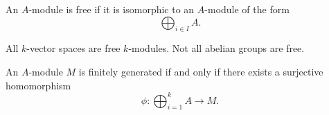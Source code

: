 \begin{df}
  An $A$-module is free if it is isomorphic to an $A$-module of the form
  \[ \bigoplus_{i \in I} A.\]
\end{df}

\begin{example}
  All $k$-vector spaces are free $k$-modules. Not all abelian groups are free.
\end{example}

\begin{lemma}
  An $A$-module $M$ is finitely generated if and only if there exists a surjective homomorphism
  \[ \phi: \bigoplus_{i=1}^k A \to M.\]
\end{lemma}

